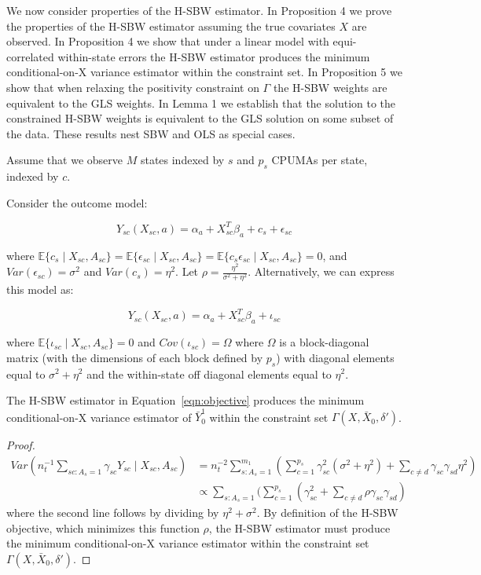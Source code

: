 We now consider properties of the H-SBW estimator. In Proposition 4 we prove the properties of the H-SBW estimator assuming the true covariates $X$ are observed. In Proposition 4 we show that under a linear model with equi-correlated within-state errors the H-SBW estimator produces the minimum conditional-on-X variance estimator within the constraint set. In Proposition 5 we show that when relaxing the positivity constraint on $\Gamma$ the H-SBW weights are equivalent to the GLS weights. In Lemma 1 we establish that the solution to the constrained H-SBW weights is equivalent to the GLS solution on some subset of the data. These results nest SBW and OLS as special cases.

Assume that we observe $M$ states indexed by $s$ and $p_s$ CPUMAs per state, indexed by $c$.

\begin{proposition}
    Consider the outcome model:

\begin{equation}
    Y_{sc}(X_{sc}, a) = \alpha_a + X_{sc}^T\beta_a + c_s + \epsilon_{sc}
\end{equation}

where $\mathbb{E}\{c_s \mid X_{sc}, A_{sc}\} = \mathbb{E}\{\epsilon_{sc} \mid X_{sc}, A_{sc}\} = \mathbb{E}\{c_s\epsilon_{sc} \mid X_{sc}, A_{sc}\} = 0$, and $Var(\epsilon_{sc}) = \sigma^2$ and $Var(c_s) = \eta^2$. Let $\rho = \frac{\eta^2}{\sigma^2 + \eta^2}$. Alternatively, we can express this model as:

\begin{equation}\label{eqn:hierarchicalmodel}
    Y_{sc}(X_{sc}, a) = \alpha_a + X_{sc}^T\beta_a + \iota_{sc}
\end{equation}

where $\mathbb{E}\{\iota_{sc} \mid X_{sc}, A_{sc}\} = 0$ and $Cov(\iota_{sc}) = \Omega$ where $\Omega$ is a block-diagonal matrix (with the dimensions of each block defined by $p_s$) with diagonal elements equal to $\sigma^2 + \eta^2$ and the within-state off diagonal elements equal to $\eta^2$.

The H-SBW estimator in Equation~\ref{eqn:objective} produces the minimum conditional-on-X variance estimator of $\bar{Y}_0^1$ within the constraint set $\Gamma(X, \bar{X}_0, \delta')$.
\end{proposition}

\begin{proof}
\begin{align*}
    Var(n_t^{-1}\sum_{sc: A_s = 1}\gamma_{sc}Y_{sc} \mid X_{sc}, A_{sc}) &= n_t^{-2}\sum_{s: A_s = 1}^{m_1}(\sum_{c = 1}^{p_s}\gamma_{sc}^2(\sigma^2 + \eta^2) + \sum_{c \ne d}\gamma_{sc}\gamma_{sd}\eta^2) \\
    &\propto \sum_{s: A_s = 1}(\sum_{c = 1}^{p_s}(\gamma_{sc}^2 + \sum_{c \ne d}\rho \gamma_{sc}\gamma_{sd})
\end{align*}
%
where the second line follows by dividing by $\eta^2 + \sigma^2$. By definition of the H-SBW objective, which minimizes this function $\rho$, the H-SBW estimator must produce the minimum conditional-on-X variance estimator within the constraint set $\Gamma(X, \bar{X}_0, \delta')$.
\end{proof}


